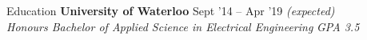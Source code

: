 \documentclass{resume} %
\begin{document}
	
	\begin{rSection}{Education}
		{\bf University of Waterloo} \hfill {Sept '14 -- Apr '19 \em (expected)} \\
		{\em Honours Bachelor of Applied Science in Electrical Engineering} \hfill {\em GPA 3.5}
		\vspace{0.5em}
	\end{rSection}
	
\end{document}
